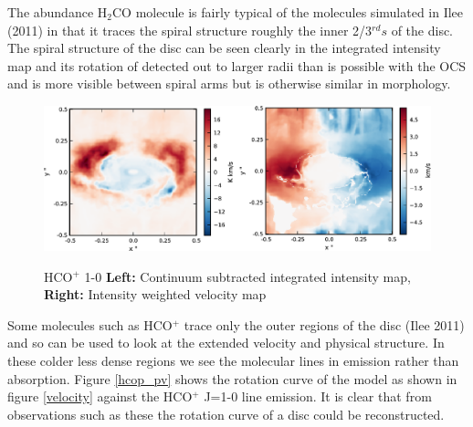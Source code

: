 \documentclass[useAMS,usenatbib]{mn2e}
\begin{document}

The abundance H$_2$CO molecule is fairly typical of the molecules simulated in Ilee (2011) in that it traces the spiral structure roughly the inner 2/3$^{rd}s$ of the disc. The spiral structure of the disc can be seen clearly in the integrated intensity map and its rotation of detected out to larger radii than is possible with the OCS and is more visible between spiral arms but is otherwise similar in morphology.

\begin{figure}
 \includegraphics[width=168mm]{Figures/sim/imageHCOp_1-0_30deg_composite_all.eps}
 \label{hco+_all}
 \caption{HCO$^+$ 1-0 {\bf Left:} Continuum subtracted integrated intensity map, {\bf Right:} Intensity weighted velocity map}
\end{figure}



Some molecules such as HCO$^+$ trace only the outer regions of the disc (Ilee 2011) and so can be used to look at the extended velocity and physical structure. In these colder less dense regions we see the molecular lines in emission rather than absorption. Figure \ref{hcop_pv} shows the rotation curve of the model as shown in figure \ref{velocity} against the HCO$^+$ J=1-0 line emission. It is clear that from observations such as these the rotation curve of a disc could be reconstructed.\newline
\end{document}
